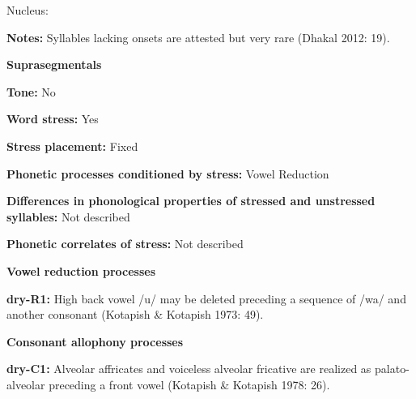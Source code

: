 \begin{styleBody}
Nucleus:
\end{styleBody}

\begin{styleBody}
\textbf{Notes: }Syllables lacking onsets are attested but very rare (Dhakal 2012: 19).
\end{styleBody}

\begin{styleBody}
\textbf{Suprasegmentals}
\end{styleBody}

\begin{styleBody}
\textbf{Tone: }No
\end{styleBody}

\begin{styleBody}
\textbf{Word stress:} Yes
\end{styleBody}

\begin{styleBody}
\textbf{Stress placement:} Fixed
\end{styleBody}

\begin{styleBody}
\textbf{Phonetic processes conditioned by stress:} Vowel Reduction
\end{styleBody}

\begin{styleBody}
\textbf{Differences in phonological properties of stressed and unstressed syllables:} Not described
\end{styleBody}

\begin{styleBody}
\textbf{Phonetic correlates of stress: }Not described
\end{styleBody}

\begin{styleBody}
\textbf{Vowel reduction processes}
\end{styleBody}

\begin{styleBody}
\textbf{dry-R1: }High back vowel /u/ may be deleted preceding a sequence of /wa/ and another consonant (Kotapish \& Kotapish 1973: 49).
\end{styleBody}

\begin{styleBody}
\textbf{Consonant allophony processes}
\end{styleBody}

\begin{styleBody}
\textbf{dry-C1: }Alveolar affricates and voiceless alveolar fricative are realized as palato-alveolar preceding a front vowel (Kotapish \& Kotapish 1978: 26).
\end{styleBody}

